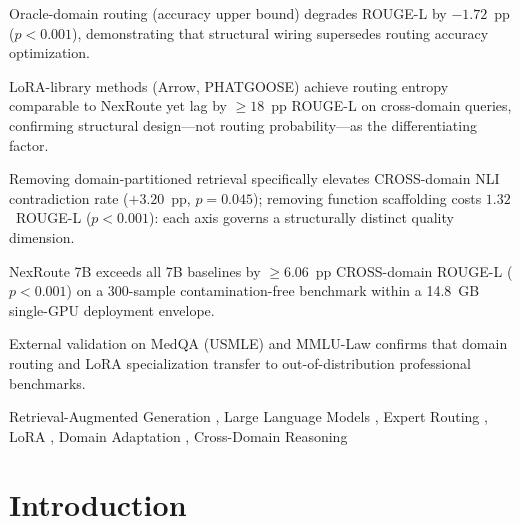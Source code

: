 \documentclass[a4paper,fleql,doubleblind]{cas-sc}
\begin{document}
\begin{highlights}
    \item Oracle-domain routing (accuracy upper bound) degrades ROUGE-L by $-1.72$~pp ($p{<}0.001$), demonstrating that structural wiring supersedes routing accuracy optimization.
    \item LoRA-library methods (Arrow, PHATGOOSE) achieve routing entropy comparable to NexRoute yet lag by ${\geq}18$~pp ROUGE-L on cross-domain queries, confirming structural design---not routing probability---as the differentiating factor.
    \item Removing domain-partitioned retrieval specifically elevates CROSS-domain NLI contradiction rate ($+3.20$~pp, $p{=}0.045$); removing function scaffolding costs $1.32$~ROUGE-L ($p{<}0.001$): each axis governs a structurally distinct quality dimension.
    \item NexRoute 7B exceeds all 7B baselines by ${\geq}6.06$~pp CROSS-domain ROUGE-L ($p{<}0.001$) on a 300-sample contamination-free benchmark within a 14.8~GB single-GPU deployment envelope.
    \item External validation on MedQA (USMLE) and MMLU-Law confirms that domain routing and LoRA specialization transfer to out-of-distribution professional benchmarks.
\end{highlights}
\begin{keywords}
Retrieval-Augmented Generation \sep
Large Language Models \sep
Expert Routing \sep
LoRA \sep
Domain Adaptation \sep
Cross-Domain Reasoning
\end{keywords}
\maketitle
\section{Introduction}
\label{sec:introduction}
\end{document}
